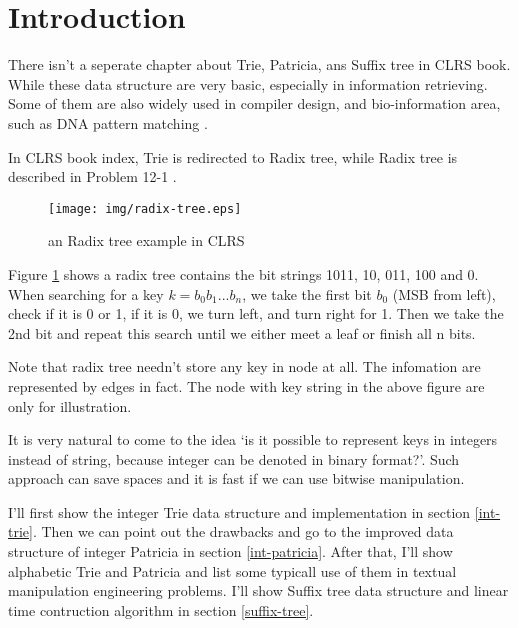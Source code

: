 \documentclass{article}
\begin{document}

\maketitle

\section{Introduction}
\label{introduction}

There isn't a seperate chapter about Trie, Patricia, ans Suffix tree
in CLRS book. While these data structure are very basic, especially in
information retrieving. Some of them are also widely used in
compiler design\cite{okasaki-int-map}, and bio-information area, such as
DNA pattern matching \cite{wiki-suffix-tree}.

In CLRS book index, Trie is redirected to Radix tree, while Radix tree
is described in Problem 12-1 \cite{CLRS}.

\begin{figure}[htbp]
       \begin{center}
	\texttt{[image: img/radix-tree.eps]}
        \caption{an Radix tree example in CLRS} \label{fig:radix-tree}
       \end{center}
\end{figure}

Figure \ref{fig:radix-tree} shows a radix tree contains the bit
strings 1011, 10, 011, 100 and 0. When searching for a key $k=b_0b_1...b_n$, we
take the first bit $b_0$ (MSB from left), check if it is 0 or 1, if it
is 0, we turn left, and turn right for 1. Then we take the 2nd bit and
repeat this search until we either meet a leaf or finish all n bits.

Note that radix tree needn't store any key in node at all. The
infomation are represented by edges in fact. The node with key string
in the above figure are only for illustration.

It is very natural to come to the idea `is it possible to represent
keys in integers instead of string, because integer can be denoted in
binary format?'. Such approach can save spaces and it is fast if we
can use bitwise manipulation.

I'll first show the integer Trie data structure and implementation in
section \ref{int-trie}. Then we can point out the drawbacks and go to
the improved data structure of integer Patricia in
section \ref{int-patricia}.
After that, I'll show alphabetic Trie and Patricia and list some
typicall use of them in textual manipulation engineering problems.
I'll show Suffix tree data structure and linear time contruction
algorithm in section \ref{suffix-tree}.
\end{document}
